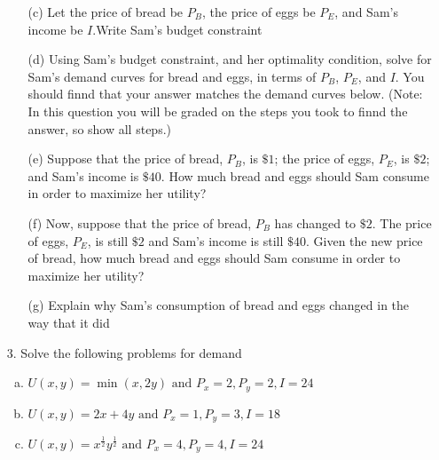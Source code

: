 \documentclass[11pt]{article}
\begin{document}
\begin{enumerate}
  \item[] 
  \begin{enumerate}[(a)] 
    \item[(c)] Let the price of bread be $P_B$, the price of eggs be $P_E$, and Sam's income be $I$.Write Sam's budget constraint

    \vspace*{20mm}
    \item[(d)] Using Sam's budget constraint, and her optimality condition, solve for Sam's demand curves for bread and eggs, in terms of $P_B$, $P_E$, and $I$. You should finnd that your answer matches the demand curves below. (Note: In this question you will be graded on the steps you took to finnd the answer, so show all steps.)
    
    \newpage
    \item[(e)] Suppose that the price of bread, $P_B$, is $\$1$; the price of eggs, $P_E$, is $\$2$; and Sam's income is $\$40$. How much bread and eggs should Sam consume in order to maximize her utility?
    
    
    \vspace*{50mm}
    \item[(f)] Now, suppose that the price of bread, $P_B$ has changed to $\$2$. The price of eggs, $P_E$, is still $\$2$ and Sam's income is still $\$40$. Given the new price of bread, how much bread and eggs should Sam consume in order to maximize her utility?
    
    \vspace*{50mm}
    \item[(g)] Explain why Sam's consumption of bread and eggs changed in the way that it did
  \end{enumerate}
\end{enumerate}

\newpage
\begin{enumerate}
  \item[3.] Solve the following problems for demand

  \begin{enumerate}[(a)]
    \item $U(x,y) = \min(x, 2y) \text{ and } P_x = 2, P_y = 2, I = 24$
    
    \vspace*{60mm}
    \item $U(x,y) = 2x + 4y \text{ and } P_x = 1, P_y = 3, I = 18$
    
    \vspace*{60mm}
    \item $U(x,y) = x^{\frac{1}{2}} y^{\frac{1}{2}}  \text{ and } P_x = 4, P_y = 4, I = 24$
  \end{enumerate}
\end{enumerate}
\end{document}
